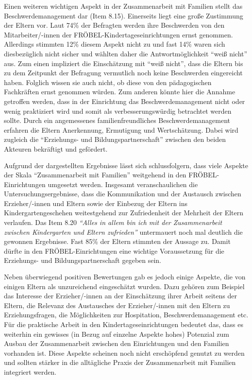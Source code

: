 \documentclass[12pt,a4paper]{article}
\begin{document}
	Einen weiteren wichtigen Aspekt in der Zusammenarbeit mit Familien stellt das Beschwerdemanagement dar (Item 8.15). Einerseits liegt eine große Zustimmung der Eltern vor. Laut 74\% der Befragten werden ihre Beschwerden von den Mitarbeiter/-innen der FRÖBEL-Kindertageseinrichtungen ernst genommen. Allerdings stimmten 12\% diesem Aspekt nicht zu und fast 14\% waren sich diesbezüglich nicht sicher und wählten daher die Antwortmöglichkeit "`weiß nicht"' aus. Zum einen impliziert die Einschätzung mit "`weiß nicht"', dass die Eltern bis zu dem Zeitpunkt der Befragung vermutlich noch keine Beschwerden eingereicht haben. Folglich wissen sie auch nicht, ob diese von den pädagogischen Fachkräften ernst genommen würden. Zum anderen könnte hier die Annahme getroffen werden, dass in der Einrichtung das Beschwerdemanagement nicht oder wenig praktiziert wird und somit als verbesserungswürdig betrachtet werden sollte. Durch ein angemessenes familienfreundliches Beschwerdemanagement erfahren die Eltern Anerkennung, Ermutigung und Wertschätzung. Dabei wird zugleich die "`Erziehungs- und Bildungspartnerschaft"' zwischen den beiden Akteuren bekräftigt und gefördert.
	
	Aufgrund der dargestellten Ergebnisse lässt sich schlussfolgern, dass viele Aspekte der Skala "`Zusammenarbeit mit Familien"' weitgehend in den FRÖBEL-Einrichtungen umgesetzt werden. Insgesamt veranschaulichen die Untersuchungsergebnisse, dass die Kommunikation und der Austausch zwischen Erzieher/-innen und Eltern sowie der Einbezug der Eltern ins Kindergartengeschehen weitestgehend zur Zufriedenheit der Mehrheit der Eltern verlaufen. Das Item 8.20 \textit{"`Alles in allem bin ich mit der Zusammenarbeit zwischen Kindergarten und Eltern zufrieden"'} untermauert noch mal deutlich die gewonnen Ergebnisse. Fast 85\% der Eltern stimmten der Aussage zu. Damit dürfte in den FRÖBEL-Einrichtungen eine wichtige Voraussetzung für die Erziehungs- und Bildungspartnerschaft gegeben sein.
	
	Neben überwiegend positiven Bewertungen gab es jedoch einige Aspekte, die von einigen Eltern als unzureichend eingeschätzt wurden. Dazu gehören zum Beispiel das Interesse der Erzieher/-innen an der Einschätzung ihrer Arbeit seitens der Eltern, die Relevanz des Austausches der Erzieher/-innen mit den Eltern zu Erziehungsfragen, die Möglichkeiten zur Hospitation, Beschwerdemanagement etc. Für die praktische Arbeit in den Kindertageseinrichtungen bedeutet das, dass es weiterhin ein gewisses (in Bezug auf einzelne Aspekte hohes) Potenzial zum Ausbau der Zusammenarbeit zwischen den Einrichtungen und den Familien vorhanden ist. Diese Aspekte scheinen noch nicht erschöpfend genutzt zu werden und sollten stärker in die alltägliche Praxis der Zusammenarbeit mit Familien integriert werden.
	
\end{document}
